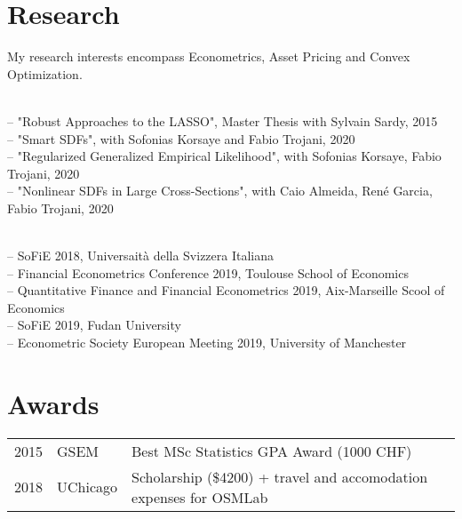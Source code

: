 \documentclass[]{deedy-resume-openfont}
\begin{document}
\begin{minipage}[t]{0.66\textwidth}

\section{Research}
My research interests encompass Econometrics, Asset Pricing and
Convex Optimization.
\sectionsep

\\ \small{
-- "Robust Approaches to the LASSO", Master Thesis with Sylvain Sardy, 2015 \\
-- "Smart SDFs", with Sofonias Korsaye and Fabio Trojani, 2020 \\
-- "Regularized Generalized Empirical Likelihood", with Sofonias Korsaye, Fabio Trojani, 2020 \\
-- "Nonlinear SDFs in Large Cross-Sections", with Caio Almeida, Ren\'e Garcia, Fabio Trojani, 2020\\
}

\\ \small{
-- SoFiE 2018, Universait\`a della Svizzera Italiana \\
-- Financial Econometrics Conference 2019, Toulouse School of Economics \\
-- Quantitative Finance and Financial Econometrics 2019, Aix-Marseille Scool of Economics\\
-- SoFiE 2019, Fudan University\\
-- Econometric Society European Meeting 2019, University of Manchester\\
}


\section{Awards}
\begin{tabular}{rll}
2015	     & GSEM & Best MSc Statistics GPA Award (1000 CHF)\\
2018         & UChicago & Scholarship (\$4200) + travel and accomodation expenses for OSMLab
\end{tabular}
\sectionsep


% 

\end{minipage} 
\end{document}

